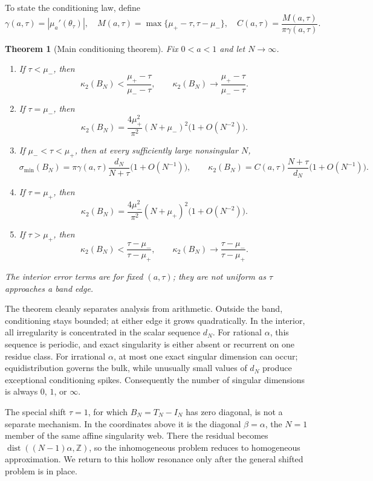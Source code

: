 \documentclass[11pt,reqno]{amsart}
\theoremstyle{plain}
\newtheorem{theorem}{Theorem}
\theoremstyle{definition}
\begin{document}
To state the conditioning law, define
\begin{equation}\label{eq:gammaC}
\gamma(a,\tau)=|\mu_a'(\theta_\tau)|,
\quad
M(a,\tau)=\max\{\mu_+-\tau,\tau-\mu_-\},
\quad
C(a,\tau)=\frac{M(a,\tau)}{\pi\gamma(a,\tau)}.
\end{equation}
\begin{theorem}[Main conditioning theorem]\label{thm:main-conditioning}
Fix $0<a<1$ and let $N\to\infty$.
\begin{enumerate}
\item If $\tau<\mu_-$, then
\[
\kappa_2(B_N)<\frac{\mu_+-\tau}{\mu_--\tau},
\qquad
\kappa_2(B_N)\longrightarrow\frac{\mu_+-\tau}{\mu_--\tau}.
\]
\item If $\tau=\mu_-$, then
\[
\kappa_2(B_N)
=\frac{4\mu_+^2}{\pi^2}(N+\mu_-)^2\bigl(1+O(N^{-2})\bigr).
\]
\item If $\mu_-<\tau<\mu_+$, then at every sufficiently large nonsingular
$N$,
\[
\sigma_{\min}(B_N)
=\pi\gamma(a,\tau)\frac{d_N}{N+\tau}\bigl(1+O(N^{-1})\bigr),
\qquad
\kappa_2(B_N)
=C(a,\tau)\frac{N+\tau}{d_N}\bigl(1+O(N^{-1})\bigr).
\]
\item If $\tau=\mu_+$, then
\[
\kappa_2(B_N)
=\frac{4\mu_-^2}{\pi^2}(N+\mu_+)^2\bigl(1+O(N^{-2})\bigr).
\]
\item If $\tau>\mu_+$, then
\[
\kappa_2(B_N)<\frac{\tau-\mu_-}{\tau-\mu_+},
\qquad
\kappa_2(B_N)\longrightarrow\frac{\tau-\mu_-}{\tau-\mu_+}.
\]
\end{enumerate}
The interior error terms are for fixed $(a,\tau)$; they are not uniform as
$\tau$ approaches a band edge.
\end{theorem}

The theorem cleanly separates analysis from arithmetic.  Outside the band,
conditioning stays bounded; at either edge it grows quadratically.  In the interior,
all irregularity is concentrated in the scalar sequence $d_N$.  For rational
$\alpha$, this sequence is periodic, and exact singularity is either absent or
recurrent on one residue class.  For irrational $\alpha$, at most one exact singular
dimension can occur; equidistribution governs the bulk, while unusually small values
of $d_N$ produce exceptional conditioning spikes.  Consequently the number of
singular dimensions is always $0$, $1$, or $\infty$.

The special shift $\tau=1$, for which $B_N=T_N-I_N$ has zero diagonal, is not a
separate mechanism.  In the coordinates above it is the diagonal $\beta=\alpha$,
the $N=1$ member of the same affine singularity web.  There the residual becomes
$\operatorname{dist}((N-1)\alpha,\mathbb Z)$, so the inhomogeneous problem reduces
to homogeneous approximation.  We return to this hollow resonance only after the
general shifted problem is in place.
\end{document}
